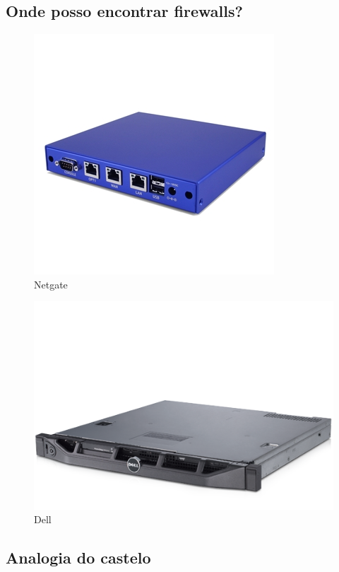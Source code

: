 \subsection{Onde posso encontrar firewalls?}
\begin{frame}
	\begin{figure}
		\centering
		\includegraphics[height=0.3\textheight]{imagens/netgate.jpg}
		\caption{Netgate}
	\end{figure}
	
	\begin{figure}
		\centering
		\includegraphics[height=0.3\textheight]{imagens/dell.png}
		\caption{Dell}
	\end{figure}
\end{frame}


\subsection{Analogia do castelo}


